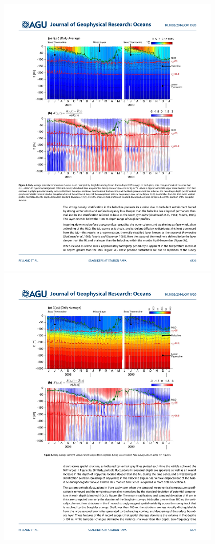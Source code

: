\begin{figure}[htp]
  \centering
  \includegraphics[]{figs/WaterMasses/PellandEtAlTheta}
  \includegraphics[]{figs/WaterMasses/PellandEtAlSal}

\end{figure}
